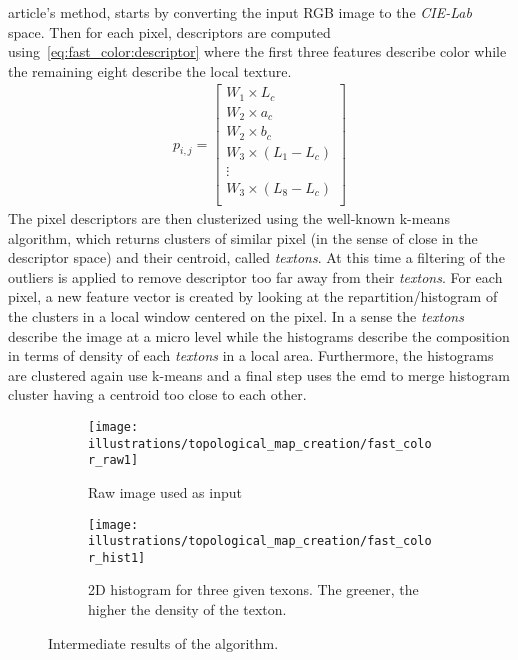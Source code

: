 \cite{rufus_blas_fast_2008} article's method, starts by converting the input RGB image to the \textit{CIE-Lab} space.
Then for each pixel, descriptors are computed using~\cref{eq:fast_color:descriptor} where the first three features
describe color while the remaining eight describe the local texture.
\begin{align}
    \label{eq:fast_color:descriptor}
    p_{i,j} = \begin{bmatrix}
                  W_1 \times L_c         \\
                  W_2 \times a_c         \\
                  W_2 \times b_c         \\
                  W_3 \times (L_1 - L_c) \\
                  \vdots                 \\
                  W_3 \times (L_8 - L_c) \\
    \end{bmatrix}
\end{align}
The pixel descriptors are then clusterized using the well-known k-means algorithm, which returns clusters of similar
pixel (in the sense of close in the descriptor space) and their centroid, called \textit{textons}.
At this time a filtering of the outliers is applied to remove descriptor too far away from their \textit{textons}.
For each pixel, a new feature vector is created by looking at the repartition/histogram of the clusters in a local
window centered on the pixel.
In a sense the \textit{textons} describe the image at a micro level while the histograms describe the composition in terms
of density of each \textit{textons} in a local area.
Furthermore, the histograms are clustered again use k-means and a final step uses the \gls{emd} to
merge histogram cluster having a centroid too close to each other.

\begin{figure}[ht!]
    \centering
    \begin{subfigure}[t]{.29\textwidth}
        \texttt{[image: illustrations/topological\_map\_creation/fast\_color\_raw1]}
        \caption{Raw image used as input}
        \label{fig:fast_color:raw_image}
    \end{subfigure}
    \hfill
    \begin{subfigure}[t]{.69\textwidth}
        \texttt{[image: illustrations/topological\_map\_creation/fast\_color\_hist1]}
        \caption{2D histogram for three given texons. The greener, the higher the density of the texton.}
        \label{fig:fast_color:histograms}
    \end{subfigure}
    \caption{Intermediate results of the algorithm.}
    \label{fig:fast_color:intermediate_histograms}
\end{figure}

